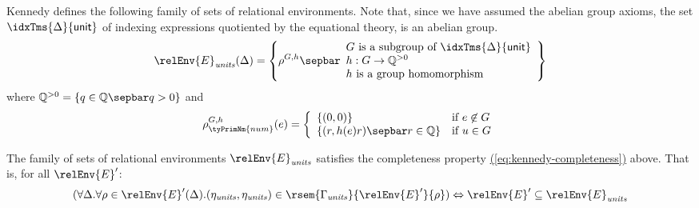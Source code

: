 Kennedy defines the following family of sets of relational
environments. Note that, since we have assumed the abelian group
axioms, the set $\idxTms{\Delta}{\mathsf{unit}}$ of indexing
expressions quotiented by the equational theory, is an abelian group.
\begin{displaymath}
  \relEnv{E}_{\mathit{units}}(\Delta) = \left\{ \rho^{G,h} \sepbar
    \begin{array}{l}
      G\textrm{ is a subgroup of }\idxTms{\Delta}{\mathsf{unit}} \\
      h : G \to \mathbb{Q}^{>0} \\
      h\textrm{ is a group homomorphism}
    \end{array}
  \right\}
\end{displaymath}
where $\mathbb{Q}^{>0} = \{ q \in \mathbb{Q} \sepbar q > 0 \}$ and
\begin{displaymath}
  \rho^{G,h}_{\tyPrimNm{num}}(e) = \left\{
    \begin{array}{ll}
      \{(0,0)\} & \textrm{if }e \not\in G \\
      \{(r,h(e)r) \sepbar r \in \mathbb{Q} \} & \textrm{if }u \in G
    \end{array}
  \right.
\end{displaymath}

\begin{theorem}
  The family of sets of relational environments
  $\relEnv{E}_{\mathit{units}}$ satisfies the completeness property
  \hyperref[eq:kennedy-completeness]{(\ref*{eq:kennedy-completeness})}
  above. That is, for all $\relEnv{E}'$:
  \begin{displaymath}
    (\forall \Delta.\forall \rho \in \relEnv{E}'(\Delta). (\eta_{\mathit{units}}, \eta_{\mathit{units}}) \in \rsem{\Gamma_{\mathit{units}}}{\relEnv{E}'}{\rho}) \Leftrightarrow \relEnv{E}'\subseteq \relEnv{E}_{\mathit{units}}
  \end{displaymath}
\end{theorem}

